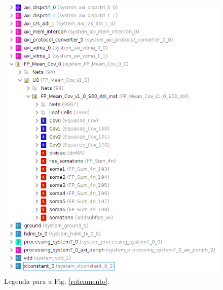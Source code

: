 \begin{figure}[!h]
	\centering
	\includegraphics[keepaspectratio=true,scale=0.35]{figuras/legenda_roteamento.png}
	\caption{Legenda para a Fig. \ref{roteamento}.}
	\label{legenda_rot}
\end{figure}

